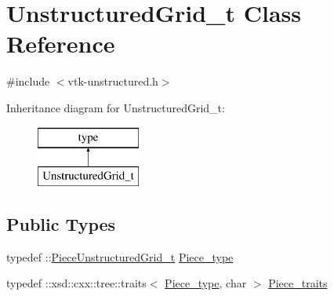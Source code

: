 \hypertarget{classUnstructuredGrid__t}{}\section{Unstructured\+Grid\+\_\+t Class Reference}
\label{classUnstructuredGrid__t}


{\ttfamily \#include $<$vtk-\/unstructured.\+h$>$}

Inheritance diagram for Unstructured\+Grid\+\_\+t\+:\begin{figure}[H]
\begin{center}
\leavevmode
\includegraphics[height=2.000000cm]{classUnstructuredGrid__t}
\end{center}
\end{figure}
\subsection*{Public Types}
\begin{DoxyCompactItemize}
\item 
typedef \+::\hyperlink{classPieceUnstructuredGrid__t}{Piece\+Unstructured\+Grid\+\_\+t} \hyperlink{classUnstructuredGrid__t_a559913611314b34f4868027fc91e35bc}{Piece\+\_\+type}
\item 
typedef \+::xsd\+::cxx\+::tree\+::traits$<$ \hyperlink{classUnstructuredGrid__t_a559913611314b34f4868027fc91e35bc}{Piece\+\_\+type}, char $>$ \hyperlink{classUnstructuredGrid__t_a8a9bf012c364a5fbb78aac9a319a4dad}{Piece\+\_\+traits}
\end{DoxyCompactItemize}
